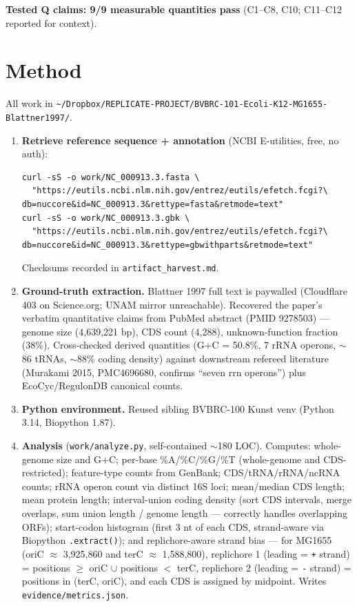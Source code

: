 \documentclass[11pt,letterpaper]{article}
\begin{document}
\noindent\textbf{Tested Q claims: 9/9 measurable quantities pass} (C1--C8, C10; C11--C12 reported for context).

\section{Method}

All work in \texttt{\textasciitilde/Dropbox/REPLICATE-PROJECT/BVBRC-101-Ecoli-K12-MG1655-Blattner1997/}.

\begin{enumerate}[nosep, leftmargin=1.4em]
\item \textbf{Retrieve reference sequence + annotation} (NCBI E-utilities, free, no auth):
\begin{lstlisting}
curl -sS -o work/NC_000913.3.fasta \
  "https://eutils.ncbi.nlm.nih.gov/entrez/eutils/efetch.fcgi?\
db=nuccore&id=NC_000913.3&rettype=fasta&retmode=text"
curl -sS -o work/NC_000913.3.gbk \
  "https://eutils.ncbi.nlm.nih.gov/entrez/eutils/efetch.fcgi?\
db=nuccore&id=NC_000913.3&rettype=gbwithparts&retmode=text"
\end{lstlisting}
Checksums recorded in \texttt{artifact\_harvest.md}.

\item \textbf{Ground-truth extraction.} Blattner 1997 full text is paywalled (Cloudflare 403 on
Science.org; UNAM mirror unreachable). Recovered the paper's verbatim quantitative claims from
PubMed abstract (PMID 9278503) --- genome size (4{,}639{,}221 bp), CDS count (4{,}288),
unknown-function fraction (38\%). Cross-checked derived quantities (G+C = 50.8\%, 7 rRNA operons,
$\sim$86 tRNAs, $\sim$88\% coding density) against downstream refereed literature
(Murakami 2015, PMC4696680, confirms ``seven rrn operons'') plus EcoCyc/RegulonDB canonical counts.

\item \textbf{Python environment.} Reused sibling BVBRC-100 Kunst venv (Python 3.14, Biopython 1.87).

\item \textbf{Analysis} (\texttt{work/analyze.py}, self-contained $\sim$180 LOC). Computes:
whole-genome size and G+C; per-base \%A/\%C/\%G/\%T (whole-genome and CDS-restricted); feature-type
counts from GenBank; CDS/tRNA/rRNA/ncRNA counts; rRNA operon count via distinct 16S loci;
mean/median CDS length; mean protein length; interval-union coding density (sort CDS intervals,
merge overlaps, sum union length / genome length --- correctly handles overlapping ORFs);
start-codon histogram (first 3 nt of each CDS, strand-aware via Biopython \texttt{.extract()});
and replichore-aware strand bias --- for MG1655 (oriC $\approx$ 3{,}925{,}860 and terC $\approx$
1{,}588{,}800), replichore 1 (leading = \texttt{+} strand) = positions $\geq$ oriC $\cup$ positions
$<$ terC, replichore 2 (leading = \texttt{-} strand) = positions in (terC, oriC), and each CDS is
assigned by midpoint. Writes \texttt{evidence/metrics.json}.


\end{enumerate}
\end{document}
